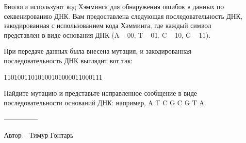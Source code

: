 \question
Биологи используют код Хэмминга для обнаружения ошибок в данных по секвенированию ДНК. Вам предоставлена следующая последовательность ДНК, закодированная с использованием кода Хэмминга, где каждый символ представлен в виде основания ДНК (A -- 00, T -- 01, C -- 10, G -- 11).

При передаче данных была внесена мутация, и закодированная последовательность ДНК выглядит вот так: 
\begin{center}
11010011010100101000011000111
\end{center}

Найдите мутацию и представьте исправленное сообщение в виде последовательности оснований ДНК: например, A T C G C G T A.

---------------

Автор -- Тимур Гонтарь